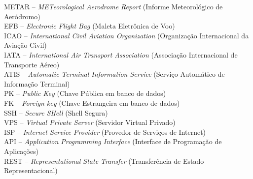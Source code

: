 \noindent \doublespacing
METAR -- \textit{METeorological Aerodrome Report} (Informe Meteorológico de Aeródromo)\\
EFB -- \textit{Electronic Flight Bag} (Maleta Eletrônica de Voo)\\
ICAO -- \textit{International Civil Aviation Organization} (Organização Internacional da Aviação Civil)\\
IATA -- \textit{International Air Transport Association} (Associação Internacional de Transporte Aéreo)\\
ATIS -- \textit{Automatic Terminal Information Service} (Serviço Automático de Informação Terminal)\\
PK -- \textit{Public Key} (Chave Pública em banco de dados)\\
FK -- \textit{Foreign key} (Chave Estrangeira em banco de dados)\\
SSH -- \textit{Secure SHell} (Shell Segura)\\
VPS -- \textit{Virtual Private Server} (Servidor Virtual Privado)\\
ISP -- \textit{Internet Service Provider} (Provedor de Serviços de Internet)\\
API -- \textit{Application Programming Interface} (Interface de Programação de Aplicações) \\
REST -- \textit{Representational State Transfer} (Transferência de Estado Representacional)\\


